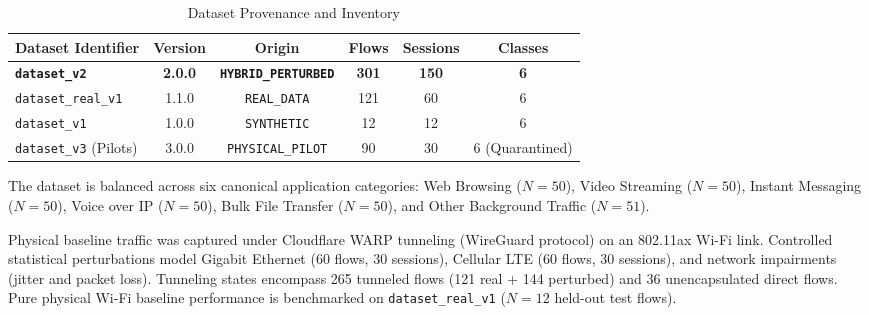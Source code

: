\documentclass[conference]{IEEEtran}
\begin{document}
\begin{table}[t]
\centering
\caption{Dataset Provenance and Inventory}
\label{tab:dataset_summary}
\footnotesize
\begin{tabularx}{\columnwidth}{lccccc}
\toprule
\textbf{Dataset Identifier} & \textbf{Version} & \textbf{Origin} & \textbf{Flows} & \textbf{Sessions} & \textbf{Classes} \\
\midrule
\textbf{\texttt{dataset\_v2}} & \textbf{2.0.0} & \textbf{\texttt{HYBRID\_PERTURBED}} & \textbf{301} & \textbf{150} & \textbf{6} \\
\texttt{dataset\_real\_v1} & 1.1.0 & \texttt{REAL\_DATA} & 121 & 60 & 6 \\
\texttt{dataset\_v1} & 1.0.0 & \texttt{SYNTHETIC} & 12 & 12 & 6 \\
\texttt{dataset\_v3} (Pilots) & 3.0.0 & \texttt{PHYSICAL\_PILOT} & 90 & 30 & 6 (Quarantined) \\
\bottomrule
\end{tabularx}
\end{table}

The dataset is balanced across six canonical application categories: Web Browsing ($N=50$), Video Streaming ($N=50$), Instant Messaging ($N=50$), Voice over IP ($N=50$), Bulk File Transfer ($N=50$), and Other Background Traffic ($N=51$).

Physical baseline traffic was captured under Cloudflare WARP tunneling (WireGuard protocol) on an 802.11ax Wi-Fi link. Controlled statistical perturbations model Gigabit Ethernet (60 flows, 30 sessions), Cellular LTE (60 flows, 30 sessions), and network impairments (jitter and packet loss). Tunneling states encompass 265 tunneled flows (121 real + 144 perturbed) and 36 unencapsulated direct flows. Pure physical Wi-Fi baseline performance is benchmarked on \texttt{dataset\_real\_v1} ($N=12$ held-out test flows).
\end{document}
